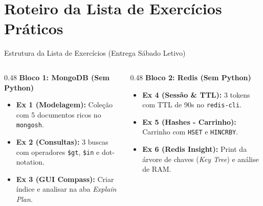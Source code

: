 \section{Roteiro da Lista de Exercícios Práticos}

\begin{frame}{Estrutura da Lista de Exercícios (Entrega Sábado Letivo)}
  \begin{columns}[T]
    \begin{column}{0.48\textwidth}
      \textbf{Bloco 1: MongoDB (Sem Python)}
      {\footnotesize
      \begin{itemize}
        \item \textbf{Ex 1 (Modelagem):} Coleção com 5 documentos ricos no \texttt{mongosh}.
        \item \textbf{Ex 2 (Consultas):} 3 buscas com operadores \texttt{\$gt}, \texttt{\$in} e dot-notation.
        \item \textbf{Ex 3 (GUI Compass):} Criar índice e analisar na aba \textit{Explain Plan}.
      \end{itemize}
      }
    \end{column}

    \begin{column}{0.48\textwidth}
      \textbf{Bloco 2: Redis (Sem Python)}
      {\footnotesize
      \begin{itemize}
        \item \textbf{Ex 4 (Sessão \& TTL):} 3 tokens com TTL de 90s no \texttt{redis-cli}.
        \item \textbf{Ex 5 (Hashes - Carrinho):} Carrinho com \texttt{HSET} e \texttt{HINCRBY}.
        \item \textbf{Ex 6 (Redis Insight):} Print da árvore de chaves (\textit{Key Tree}) e análise de RAM.
      \end{itemize}
      }
    \end{column}
  \end{columns}
\end{frame}


